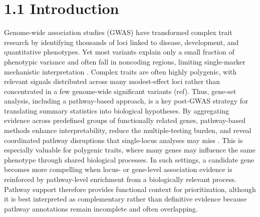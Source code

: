 \documentclass[unnumsec,webpdf,contemporary,large]{oup-authoring-template}%
\theoremstyle{thmstyleone}%
\theoremstyle{thmstyletwo}%
\theoremstyle{thmstylethree}%
\begin{document}

\maketitle



\section{1.1 Introduction}

Genome-wide association studies (GWAS) have transformed complex trait research by identifying thousands of loci linked to disease, development, and quantitative phenotypes. Yet most variants explain only a small fraction of phenotypic variance and often fall in noncoding regions, limiting single-marker mechanistic interpretation \citep{Manolio2009,Boyle2017}. Complex traits are often highly polygenic, with relevant signals distributed across many modest-effect loci rather than concentrated in a few genome-wide significant variants (ref). Thus, gene-set analysis, including a pathway-based approach, is a key post-GWAS strategy for translating summary statistics into biological hypotheses. By aggregating evidence across predefined groups of functionally related genes, pathway-based methods enhance interpretability, reduce the multiple-testing burden, and reveal coordinated pathway disruptions that single-locus analyses may miss \citep{Mooney2015,deLeeuw2015}. This is especially valuable for polygenic traits, where many genes may influence the same phenotype through shared biological processes. In such settings, a candidate gene becomes more compelling when locus- or gene-level association evidence is reinforced by pathway-level enrichment from a biologically relevant process. Pathway support therefore provides functional context for prioritization, although it is best interpreted as complementary rather than definitive evidence because pathway annotations remain incomplete and often overlapping.
\end{document}
